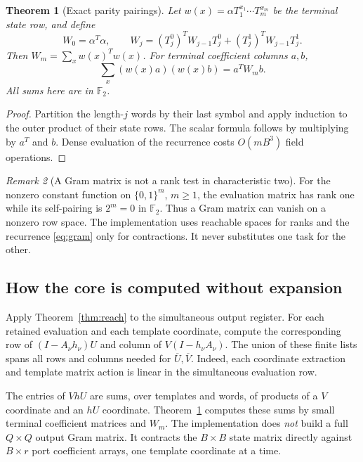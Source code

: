 \documentclass[11pt,letterpaper]{article}
\newcommand{\F}{{\mathbb F_2}}
\newtheorem{theorem}{Theorem}[section]
\theoremstyle{definition}
\theoremstyle{remark}
\newtheorem{remark}[theorem]{Remark}
\numberwithin{equation}{section}
\begin{document}
\begin{theorem}[Exact parity pairings]
\label{thm:pair}
Let $w(x)=\alpha T_1^{x_1}\cdots T_m^{x_m}$ be the terminal state row,
and define
\begin{equation}
 W_0=\alpha^T\alpha,\qquad
 W_j=(T_j^0)^TW_{j-1}T_j^0+(T_j^1)^TW_{j-1}T_j^1.
 \label{eq:gram}
\end{equation}
Then $W_m=\sum_x w(x)^Tw(x)$. For terminal coefficient columns $a,b$,
\begin{equation}
 \sum_x (w(x)a)(w(x)b)=a^TW_mb.
 \label{eq:pair}
\end{equation}
All sums here are in $\F$.
\end{theorem}
\begin{proof}
Partition the length-$j$ words by their last symbol and apply induction
to the outer product of their state rows. The scalar formula follows by
multiplying by $a^T$ and $b$. Dense evaluation of the recurrence costs
$O(mB^3)$ field operations.
\end{proof}

\begin{remark}[A Gram matrix is not a rank test in characteristic two]
\label{rem:gram}
For the nonzero constant function on $\{0,1\}^m$, $m\ge1$, the evaluation
matrix has rank one while its self-pairing is $2^m=0$ in $\F$. Thus a Gram
matrix can vanish on a nonzero row space. The implementation uses reachable
spaces for ranks and the recurrence \eqref{eq:gram} only for contractions.
It never substitutes one task for the other.
\end{remark}

\subsection{How the core is computed without expansion}
Apply Theorem~\ref{thm:reach} to the simultaneous output register. For each
retained evaluation and each template coordinate, compute the corresponding
row of $(I-A_\nu h_\nu)U$ and column of $V(I-h_\nu A_\nu)$. The union of
these finite lists spans all rows and columns needed for
$\overline U,\overline V$. Indeed, each coordinate extraction and template
matrix action is linear in the simultaneous evaluation row.

The entries of $VhU$ are sums, over templates and words, of products of a
$V$ coordinate and an $hU$ coordinate. Theorem~\ref{thm:pair} computes these
sums by small terminal coefficient matrices and $W_m$. The implementation
does \emph{not} build a full $Q\times Q$ output Gram matrix. It contracts
the $B\times B$ state matrix directly against $B\times r$ port
coefficient arrays, one template coordinate at a time.
\end{document}
